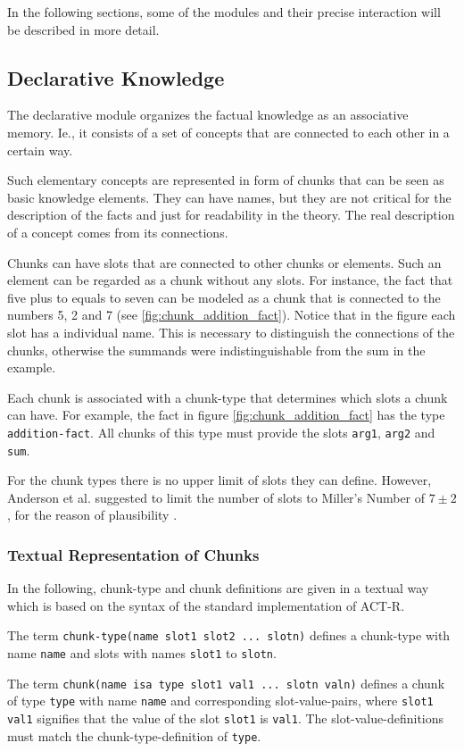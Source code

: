 In the following sections, some of the modules and their precise interaction will be described in more detail.

\subsection{Declarative Knowledge}

The declarative module organizes the factual knowledge as an associative memory. Ie., it consists of a set of concepts that are connected to each other in a certain way.

Such elementary concepts are represented in form of chunks that can be seen as basic knowledge elements. They can have names, but they are not critical for the description of the facts and just for readability in the theory. The real description of a concept comes from its connections.

Chunks can have slots that are connected to other chunks or elements. Such an element can be regarded as a chunk without any slots. For instance, the fact that five plus to equals to seven can be modeled as a chunk that is connected to the numbers 5, 2 and 7 (see \ref{fig:chunk_addition_fact}). Notice that in the figure each slot has a individual name. This is necessary to distinguish the connections of the chunks, otherwise the summands were indistinguishable from the sum in the example.

Each chunk is associated with a chunk-type that determines which slots a chunk can have. For example, the fact in figure \ref{fig:chunk_addition_fact} has the type \verb|addition-fact|. All chunks of this type must provide the slots \verb|arg1|, \verb|arg2| and \verb|sum|.

For the chunk types there is no upper limit of slots they can define. However, Anderson et al. suggested to limit the number of slots to Miller's Number of $7 \pm 2$, for the reason of plausibility \cite{unknown}. 

\subsubsection{Textual Representation of Chunks}

In the following, chunk-type and chunk definitions are given in a textual way which is based on the syntax of the standard implementation of ACT-R.

\begin{definition}
The term \verb|chunk-type(name slot1 slot2 ... slotn)| defines a chunk-type with name \verb|name| and slots with names \verb|slot1| to \verb|slotn|.

The term \verb|chunk(name isa type slot1 val1 ... slotn valn)| defines a chunk of type \verb|type| with name \verb|name| and corresponding slot-value-pairs, where \verb|slot1 val1| signifies that the value of the slot \verb|slot1| is \verb|val1|. The slot-value-definitions must match the chunk-type-definition of \verb|type|.
\end{definition}

